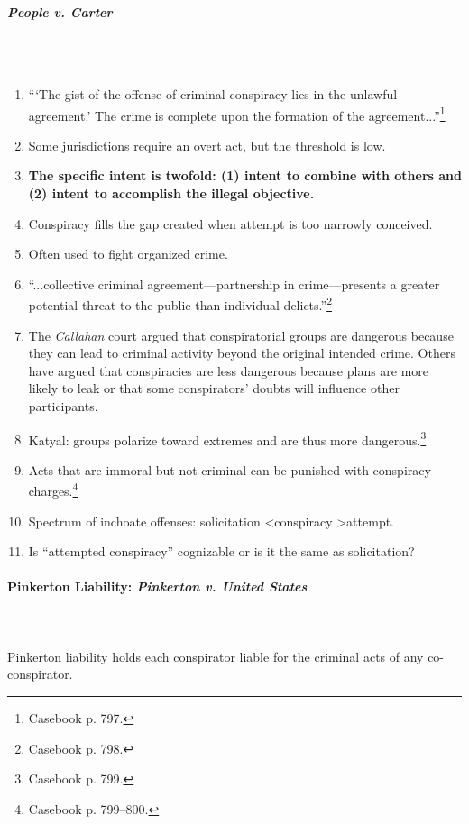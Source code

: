 \paragraph{\emph{People v. Carter}}
~\\\\
\begin{enumerate}
    \item ```The gist of the offense of criminal conspiracy lies in the 
    unlawful agreement.' The crime is complete upon the formation of the 
    agreement...''\footnote{Casebook p. 797.}
    \item Some jurisdictions require an overt act, but the threshold is low.
    \item \textbf{The specific intent is twofold: (1) intent to combine with 
    others and (2) intent to accomplish the illegal objective.}
    \item Conspiracy fills the gap created when attempt is too narrowly 
    conceived.
    \item Often used to fight organized crime.
    \item ``...collective criminal agreement---partnership in crime---presents 
    a greater potential threat to the public than individual 
    delicts.''\footnote{Casebook p. 798.}
    \item The \emph{Callahan} court argued that conspiratorial groups are 
    dangerous because they can lead to criminal activity beyond the original 
    intended crime. Others have argued that conspiracies are less dangerous 
    because plans are more likely to leak or that some conspirators' doubts 
    will influence other participants.
    \item Katyal: groups polarize toward extremes and are thus more 
    dangerous.\footnote{Casebook p. 799.}
    \item Acts that are immoral but not criminal can be punished with 
    conspiracy charges.\footnote{Casebook p. 799--800.}
    \item Spectrum of inchoate offenses: solicitation \textless conspiracy 
    \textgreater attempt.
    \item Is ``attempted conspiracy'' cognizable or is it the same as 
    solicitation?
\end{enumerate}

\paragraph{Pinkerton Liability: \emph{Pinkerton v. United States}}
~\\\\
Pinkerton liability holds each conspirator liable for the criminal acts of any 
co-conspirator.

